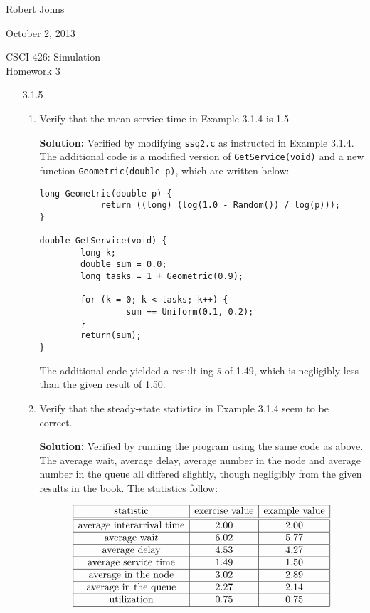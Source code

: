 \documentclass[11pt]{article} %
\begin{document}
\hfill Robert Johns

\hfill October 2, 2013

\begin{center} {\Large CSCI 426: Simulation}\\{\large Homework 3}\end{center}

\begin{enumerate}

\item[3.1.5]
\begin{enumerate}

\item Verify that the mean service time in Example 3.1.4 is 1.5

{\bf Solution:} Verified by modifying \texttt{ssq2.c} as instructed in Example 3.1.4.  The additional code is a modified version of \texttt{GetService(void)} and a new function \texttt{Geometric(double p)}, which are written below:

\begin{verbatim}
long Geometric(double p) {
        	return ((long) (log(1.0 - Random()) / log(p)));
}

double GetService(void) {
        long k;
        double sum = 0.0;
        long tasks = 1 + Geometric(0.9);
  
        for (k = 0; k < tasks; k++) {
                 sum += Uniform(0.1, 0.2);
        }
        return(sum);
}
\end{verbatim}

The additional code yielded a result ing $\bar{s}$ of 1.49, which is negligibly less than the given result of 1.50.

\item Verify that the steady-state statistics in Example 3.1.4 seem to be correct.

{\bf Solution:} Verified by running the program using the same code as above.  The average wait, average delay, average number in the node and average number in the queue all differed slightly, though negligibly from the given results in the book.  The statistics follow:

$$\begin{array}{|c|c|c|}\hline
\textrm{statistic} & \textrm{exercise value} & \textrm{example value}\\\hline\hline
\textrm{average interarrival time} &   2.00 & 2.00\\\hline
\textrm{average wai}t  &  6.02 & 5.77\\\hline
\textrm{average delay}  &   4.53 & 4.27\\\hline
\textrm{average service time}  &   1.49 & 1.50\\\hline
\textrm{average in the node} &   3.02 & 2.89\\\hline
\textrm{average in the queue} &   2.27 & 2.14 \\\hline
\textrm{utilization} &   0.75 & 0.75 \\\hline
\end{array}$$


\end{enumerate}
\end{enumerate}
\end{document}
